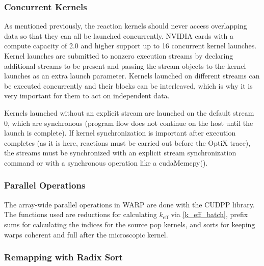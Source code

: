 \subsubsection{Concurrent Kernels}

As mentioned previously, the reaction kernels should never access overlapping data so that they can all be launched concurrently.  NVIDIA cards with a compute capacity of 2.0 and higher support up to 16 concurrent kernel launches.  Kernel launches are submitted to nonzero execution streams by declaring additional streams to be present and passing the stream objects to the kernel launches as an extra launch parameter.  Kernels launched on different streams can be executed concurrently and their blocks can be interleaved, which is why it is very important for them to act on independent data. %

Kernels launched without an explicit stream are launched on the default stream 0, which are synchronous (program flow does not continue on the host until the launch is complete).  If kernel synchronization is important after execution completes (as it is here, reactions must be carried out before the OptiX trace), the streams must be synchronized with an explicit stream synchronization command or with a synchronous operation like a cudaMemcpy().%

\subsubsection{Parallel Operations}

The array-wide parallel operations in WARP are done with the CUDPP library.  The functions used are reductions for calculating $k_\mathrm{eff}$ via \eqref{k_eff_batch}, prefix sums for calculating the indices for the source pop kernels, and sorts for keeping warps coherent and full after the microscopic kernel.

\subsubsection{Remapping with Radix Sort}


